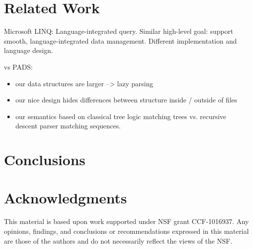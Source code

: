 \documentclass[nocopyrightspace,natbib]{sigplanconf}
\begin{document}
\section{Related Work}
\label{sec:related}

Microsoft LINQ: Language-integrated query.  Similar high-level goal:
support smooth, language-integrated data management.  Different 
implementation and language design.

vs PADS:  
\begin{itemize}
\item our data structures are larger --> lazy parsing
\item our nice design hides differences between structure inside /
outside of files
\item our semantics based on classical tree logic matching trees vs. 
recursive descent parser matching sequences.
\end{itemize}

\section{Conclusions}
\label{sec:conclusion}


\section*{Acknowledgments}

This material is based upon work 
supported under NSF grant CCF-1016937.
Any opinions, findings, and conclusions or recommendations
   expressed in this material are those of the authors and do not
   necessarily reflect the views of the NSF.


%



%
\end{document}
